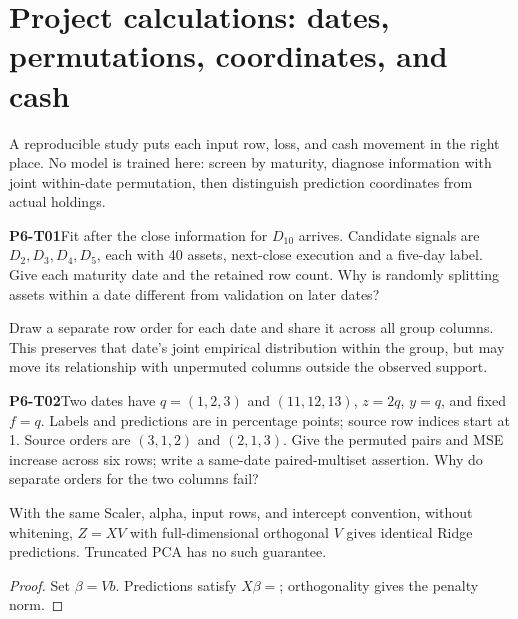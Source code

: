 \clearpage\section{Project calculations: dates, permutations, coordinates, and cash}
\begin{strand}
A reproducible study puts each input row, loss, and cash movement in the right place. No model is trained here: screen by maturity, diagnose information with joint within-date permutation, then distinguish prediction coordinates from actual holdings.
\end{strand}
\begin{yourturn}\textbf{P6-T01}\quad Fit after the close information for $D_{10}$ arrives. Candidate signals are $D_2,D_3,D_4,D_5$, each with 40 assets, next-close execution and a five-day label. Give each maturity date and the retained row count. Why is randomly splitting assets within a date different from validation on later dates?\workspace[4]\end{yourturn}
\begin{definition}
Draw a separate row order for each date and share it across all group columns. This preserves that date's joint empirical distribution within the group, but may move its relationship with unpermuted columns outside the observed support.
\end{definition}
\begin{yourturn}\textbf{P6-T02}\quad Two dates have $q=(1,2,3)$ and $(11,12,13)$, $z=2q $, $y=q $, and fixed $f=q $. Labels and predictions are in percentage points; source row indices start at 1. Source orders are $(3,1,2)$ and $(2,1,3)$. Give the permuted pairs and MSE increase across six rows; write a same-date paired-multiset assertion. Why do separate orders for the two columns fail?\workspace[4]\end{yourturn}
\clearpage
\begin{proposition}
With the same Scaler, alpha, input rows, and intercept convention, without whitening, $Z=XV $ with full-dimensional orthogonal $V $ gives identical Ridge predictions. Truncated PCA has no such guarantee.
\end{proposition}
\begin{proof}
Set $\beta=Vb $. Predictions satisfy $X\beta=$\fillin[2cm]; orthogonality gives the penalty norm\fillin[2.2cm].
\end{proof}
